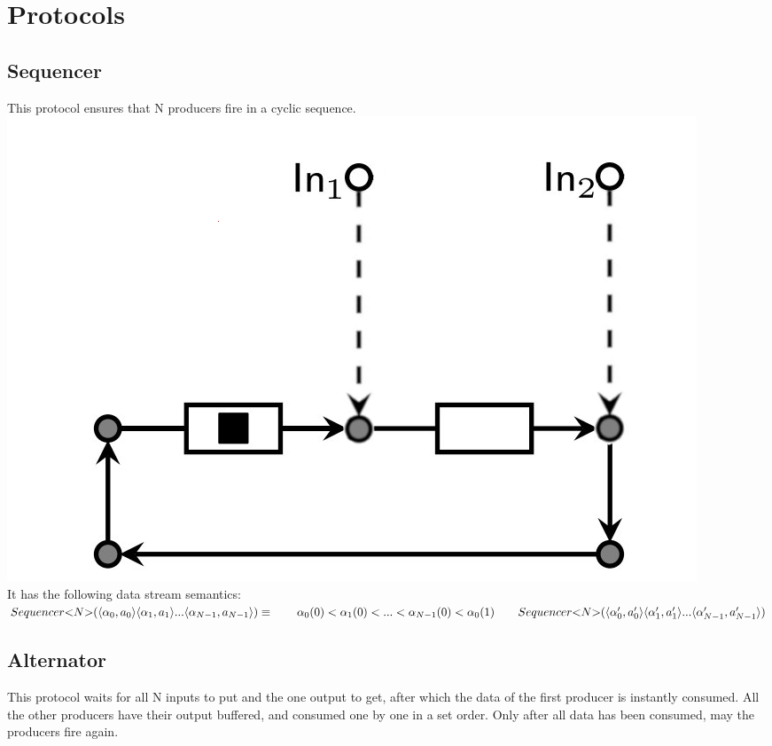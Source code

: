 \section{Protocols}
\subsection{Sequencer}
This protocol ensures that N producers fire in a cyclic sequence.\\

\includegraphics[]{img/seq.png}\\
%
It has the following data stream semantics:\\
%
$
Sequencer{<}N{>}(\langle \alpha_0, a_0 \rangle \langle \alpha_1, a_1 \rangle... \langle \alpha_{N-1}, a_{N-1} \rangle) \equiv \\
\hphantom \qquad  \alpha_0(0) < \alpha_1(0) < ... < \alpha_{N-1}(0) < \alpha_0(1) \\
\hphantom \qquad Sequencer{<}N{>}(\langle \alpha_0', a_0' \rangle \langle \alpha_1', a_1' \rangle... \langle \alpha_{N-1}', a_{N-1}' \rangle)
$


\subsection{Alternator}
This protocol waits for all N inputs to put and the one output to get, after which the data of the first producer is instantly consumed.
All the other producers have their output buffered, and consumed one by one in a set order.
Only after all data has been consumed, may the producers fire again.\\

